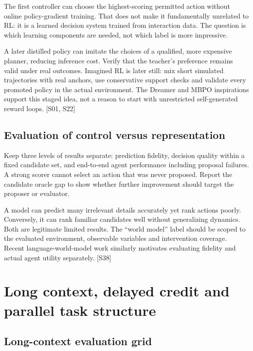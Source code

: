 \documentclass[
  11pt,
  a4paper,
]{article}
\begin{document}
The first controller can choose the highest-scoring permitted action
without online policy-gradient training. That does not make it
fundamentally unrelated to RL: it is a learned decision system trained
from interaction data. The question is which learning components are
needed, not which label is more impressive.

A later distilled policy can imitate the choices of a qualified, more
expensive planner, reducing inference cost. Verify that the teacher's
preference remains valid under real outcomes. Imagined RL is later
still: mix short simulated trajectories with real anchors, use
conservative support checks and validate every promoted policy in the
actual environment. The Dreamer and MBPO inspirations support this
staged idea, not a reason to start with unrestricted self-generated
reward loops. {[}S01, S22{]}

\subsection{Evaluation of control versus
representation}\label{evaluation-of-control-versus-representation}

Keep three levels of results separate: prediction fidelity, decision
quality within a fixed candidate set, and end-to-end agent performance
including proposal failures. A strong scorer cannot select an action
that was never proposed. Report the candidate oracle gap to show whether
further improvement should target the proposer or evaluator.

A model can predict many irrelevant details accurately yet rank actions
poorly. Conversely, it can rank familiar candidates well without
generalizing dynamics. Both are legitimate limited results. The ``world
model'' label should be scoped to the evaluated environment, observable
variables and intervention coverage. Recent language-world-model work
similarly motivates evaluating fidelity and actual agent utility
separately. {[}S38{]}

\section{Long context, delayed credit and parallel task
structure}\label{long-context-delayed-credit-and-parallel-task-structure}

\subsection{Long-context evaluation
grid}\label{long-context-evaluation-grid}
\end{document}
